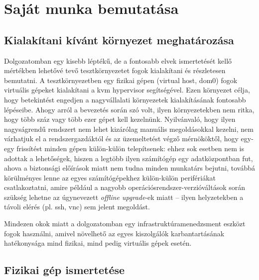 
\chapter{Saját munka bemutatása}
\label{chap:testenv}

\section{Kialakítani kívánt környezet meghatározása}
Dolgozatomban egy kisebb léptékű, de a fontosabb elvek ismertetését kellő mértékben lehetővé tevő tesztkörnyezetet fogok kialakítani és részletesen bemutatni. A tesztkörnyezetben egy fizikai gépen (virtual host, dom0) fogok virtuális gépeket kialakítani a \acrshort{kvm} hypervisor segítségével. Ezen környezet célja, hogy betekintést engedjen a nagyvállalati környezetek kialakításának fontosabb lépéseibe. Ahogy arról a bevezetés során szó volt, ilyen környezetekben nem ritka, hogy több száz vagy több ezer gépet kell kezelnünk. Nyilvánvaló, hogy ilyen nagyságrendű rendszert nem lehet kizárólag manuális megoldásokkal kezelni, nem várhatjuk el a rendszergazdáktól és az üzemeltetést végző mérnököktől, hogy egy-egy frissítést minden gépen külön-külön telepítsenek: ehhez sok esetben nem is adottak a lehetőségek, hiszen a legtöbb ilyen számítógép egy adatközpontban fut, ahova a biztonsági előírások miatt nem tudna minden munkatárs bejutni, továbbá körülményes lenne az egyes számítógépekhez külön-külön perifériákat csatlakoztatni, amire például a nagyobb operációsrendszer-verzióváltások során szükség lehetne az úgynevezett \textit{offline upgrade}-ek miatt -- ilyen helyzetekben a távoli elérés (pl. \acrshort{ssh}, \acrshort{vnc}) sem jelent megoldást.

Mindezen okok miatt a dolgozatomban egy infrastruktúramenedzsment eszközt fogok használni, amivel növelhető az egyes kiszolgálók karbantartásának hatékonysága mind fizikai, mind pedig virtuális gépek esetén.

\section{Fizikai gép ismertetése}

